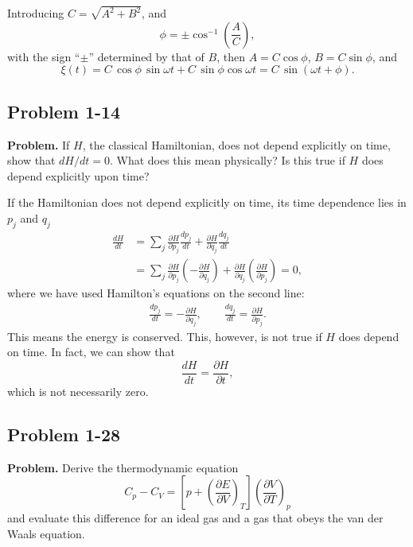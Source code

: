 \documentclass[twocolumn, 10pt]{article}
\numberwithin{equation}{section}
\newenvironment{problem}
{\par\medskip \color{problemblue}
  \textbf{Problem. }\ignorespaces}
{\medskip}
\newenvironment{solution}[1][\empty]
{\par\medskip\sffamily
  \textbf{\ifx\empty#1{Solution.}\relax\else{#1}\fi} \ignorespaces}
{\medskip}
\begin{document}
\begin{solution}
Introducing $C = \sqrt{A^2 + B^2}$,
and
$$\phi = \pm \cos^{-1} \left( \frac A C \right),$$
with the sign ``$\pm$'' determined by that of $B$,
then $A = C \cos\phi$, $B = C \sin\phi$, and
$$
\xi(t) = C \, \cos\phi \, \sin \omega t + C \, \sin\phi \cos \omega t
= C \, \sin(\omega t + \phi).
$$
\end{solution}


\subsection{Problem 1-14}

\begin{problem}
If $H$, the classical Hamiltonian, does not depend explicitly on time,
show that $dH/dt = 0$.
What does this mean physically?
Is this true if $H$ does depend explicitly upon time?
\end{problem}

\begin{solution}
If the Hamiltonian does not depend explicitly on time,
its time dependence lies in $p_j$ and $q_j$
\begin{align*}
  \frac{dH}{dt}
  &= \sum_j
  \frac{ \partial H } { \partial p_j}
  \frac{ d p_j } { d t }
   +
  \frac{ \partial H } { \partial q_j}
  \frac{ d q_j } { d t }
  \\
  &= \sum_j
  \frac{ \partial H } { \partial p_j}
  \left( - \frac{ \partial H } { \partial q_j} \right)
   +
  \frac{ \partial H } { \partial q_j}
  \left( \frac{ \partial H } { \partial p_j} \right)
  = 0,
\end{align*}
where we have used Hamilton's equations
on the second line:
\begin{align*}
  \frac{ d p_j } { d t }
  =
  - \frac{ \partial H } { \partial q_j}
  ,
  \qquad
  \frac{ d q_j } { d t }
  = \frac{ \partial H } { \partial p_j}
  .
\end{align*}
This means the energy is conserved.
This, however, is not true if $H$ does depend on time.
%
In fact, we can show that
$$
  \frac{ d H } { d t }
  =
  \frac{ \partial H } { \partial t }
  ,
$$
which is not necessarily zero.
\end{solution}


\subsection{Problem 1-28}

\begin{problem}
  Derive the thermodynamic equation
  \begin{equation}
    C_p - C_V
    = \left[ p + \left( \frac{ \partial E } { \partial V } \right)_T \right]
    \left( \frac{ \partial V } { \partial T } \right)_p
    \label{eq:CpCV1}
  \end{equation}
  and evaluate this difference for an ideal gas
  and a gas that obeys the van der Waals equation.
\end{problem}
\end{document}
